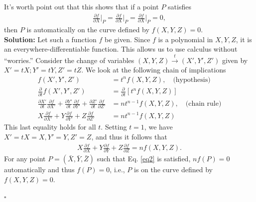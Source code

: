 \documentclass[12pt]{article}
\newcommand{\p}{\partial}
\newcommand{\nn}{\nonumber}
\newcommand{\f}[2]{\frac{#1}{#2}}
\begin{document}
It's worth point out that this shows that if a point $P$ satisfies 
\begin{align}\label{eq2}
\f{\p f}{\p X}\bigg\vert_P = \f{\p f}{\p X}\bigg\vert_P  = \f{\p f}{\p X}\bigg\vert_P = 0,
\end{align}
then $P$ is automatically on the curve defined by $f(X,Y,Z) = 0$.\\











\noindent \textbf{Solution:} Let such a function $f$ be given. Since $f$ is a polynomial in $X,Y,Z$, it is an everywhere-differentiable function. This allows us to use calculus without ``worries.'' Consider the change of variables $(X,Y,Z) \xrightarrow{t} (X',Y',Z')$ given by $X'=tX; Y'=tY, Z'=tZ$. We look at the following chain of implications
\begin{align*}
f(X',Y',Z') &= t^n f(X,Y,Z), \quad \text{(hypothesis)}\nn\\
\f{\p}{\p t} f(X',Y',Z') &= \f{\p }{\p t} [t^n f(X,Y,Z)]\nn\\
\f{\p X'}{\p t}\f{\p f}{\p X'} + \f{\p Y'}{\p t}\f{\p f}{\p Y'} + \f{\p Z'}{\p t}\f{\p f}{\p Z'} &= nt^{n-1}f(X,Y,Z), \quad \text{(chain rule)}\nn\\
X\f{\p f}{\p X'} + Y\f{\p f}{\p Y'} + Z\f{\p f}{\p Z'}&= nt^{n-1}f(X,Y,Z)
\end{align*}
This last equality holds for all $t$. Setting $t=1$, we have $X' = tX = X, Y'=Y, Z'=Z$, and thus it follows that
\begin{align*}
X\f{\p f}{\p X} + Y\f{\p f}{\p Y} + Z\f{\p f}{\p Z}= nf(X,Y,Z).
\end{align*}
For any point $P = (\bar{X},\bar{Y}, \bar{Z})$ such that Eq. \eqref{eq2} is satisfied, $nf(P) = 0$ automatically and thus $f(P) = 0$, i.e., $P$ is on the curve defined by $f(X,Y,Z) = 0$. 

\hfill $\square$

\end{document}
